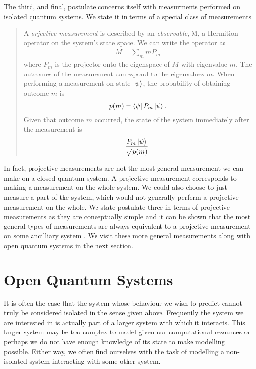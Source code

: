 The third, and final, postulate concerns itself with measurments performed on isolated quantum systems. We state it in terms of a special class of measurements
\begin{quotation}
  A \textit{prjective measurement} is described by an \textit{observable}, M, a Hermition operator on the system's state space. We can write the operator as
  \begin{align}
    M = \sum_m mP_m
  \end{align}
  where $P_m$ is the projector onto the eigenspace of $M$ with eigenvalue $m$. The outcomes of the measurement correspond to the eigenvalues $m$. When performing a measurement on state $\left\vert\psi\right\rangle$, the probability of obtaining outcome $m$ is
  \begin{align}
    p(m) = \left\langle \psi\right\vert P_m\left\vert\psi\right\rangle.
  \end{align}
  Given that outcome $m$ occurred, the state of the system immediately after the measurement is
  \begin{align}
    \frac{P_m\left\vert\psi\right\rangle}{\sqrt{p(m)}}.
  \end{align}
\end{quotation}
In fact, projective measurements are not the most general measurement we can make on a closed quantum system. A projective measurement corresponds to making a measurement on the whole system. We could also choose to just measure a part of the system, which would not generally perform a projective measurement on the whole. We state postulate three in terms of projective measurements as they are conceptually simple and it can be shown that the most general types of measurements are always equivalent to a projective measurement on some ancilliary system \cite{neumark}. We visit these more general measurements along with open quantum systems in the next section.


\section{Open Quantum Systems}

It is often the case that the system whose behaviour we wish to predict cannot truly be considered isolated in the sense given above. Frequently the system we are interested in is actually part of a larger system with which it interacts. This larger system may be too complex to model given our computational resources or perhaps we do not have enough knowledge of its state to make modelling possible. Either way, we often find ourselves with the task of modelling a non-isolated system interacting with some other system. 

